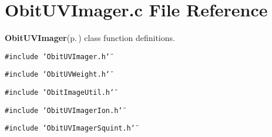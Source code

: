 \section{Obit\-UVImager.c File Reference}
\label{ObitUVImager_8c}
{\bf Obit\-UVImager}{\rm (p.\,\pageref{structObitUVImager})} class function definitions. 

{\tt \#include \char`\"{}Obit\-UVImager.h\char`\"{}}\par
{\tt \#include \char`\"{}Obit\-UVWeight.h\char`\"{}}\par
{\tt \#include \char`\"{}Obit\-Image\-Util.h\char`\"{}}\par
{\tt \#include \char`\"{}Obit\-UVImager\-Ion.h\char`\"{}}\par
{\tt \#include \char`\"{}Obit\-UVImager\-Squint.h\char`\"{}}\par

